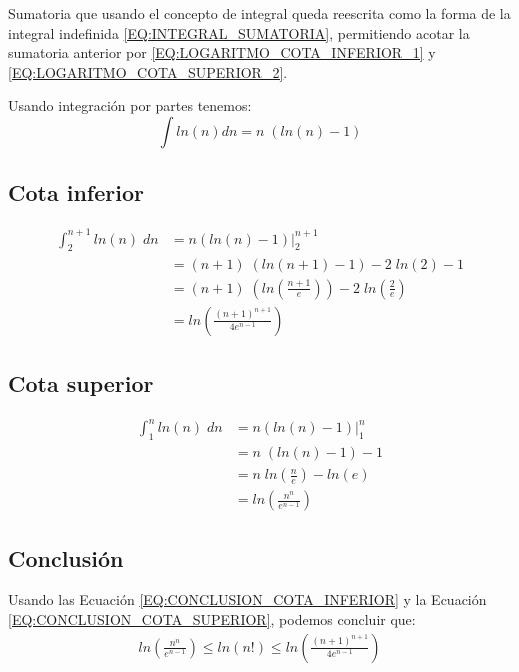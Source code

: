 \documentclass[11pt]{utalcaDoc}
\numberwithin{equation}{section}
\begin{document}
Sumatoria que usando el concepto de integral queda reescrita como la forma de la integral indefinida \ref{EQ:INTEGRAL_SUMATORIA}, permitiendo acotar la sumatoria anterior por \ref{EQ:LOGARITMO_COTA_INFERIOR_1} y \ref{EQ:LOGARITMO_COTA_SUPERIOR_2}.

Usando integración por partes tenemos:
\begin{equation}
	\int ln(n)dn = n\;(ln(n)-1)
\end{equation}

\subsection{Cota inferior}
\begin{align}
	\int_{2}^{n+1} \! ln(n)\;dn &= n(ln(n)-1) \bigg|_{2}^{n+1} \nonumber \\
	&=(n+1)\;\left(ln(n+1)-1\right) - 2\;ln(2) - 1	\nonumber \\
	&=(n+1)\;\left(ln\left(\frac{n+1}{e}\right)\right)-2\;ln\left(\frac{2}{e}\right) \nonumber \\
	&=ln\left(\frac{(n+1)^{n+1}}{4e^{n-1}}\right) \label{EQ:CONCLUSION_COTA_INFERIOR}
\end{align}

\subsection{Cota superior}
\begin{align}
	\int_{1}^{n} \! ln(n)\;dn &= n(ln(n)-1) \bigg|_{1}^{n} \nonumber \\
	&=n\;\left(ln(n)-1\right) - 1 \nonumber \\
	&=n\;ln\left(\frac{n}{e}\right) - ln(e) \nonumber \\
	&=ln\left(\frac{n^{n}}{e^{n-1}}\right) \label{EQ:CONCLUSION_COTA_SUPERIOR}
\end{align}

\subsection{Conclusión}
Usando las Ecuación \ref{EQ:CONCLUSION_COTA_INFERIOR} y la Ecuación \ref{EQ:CONCLUSION_COTA_SUPERIOR}, podemos concluir que:
\begin{align}
	ln\left(\frac{n^{n}}{e^{n-1}}\right)
	\leq
	ln(n!)
	\leq
	ln\left(\frac{(n+1)^{n+1}}{4e^{n-1}}\right) \nonumber
\end{align}
\end{document}
